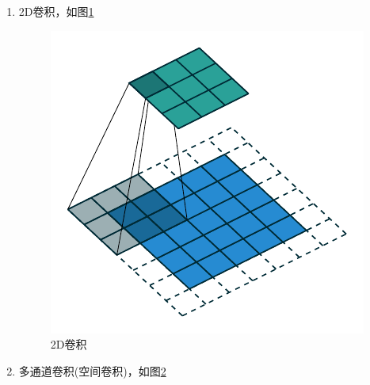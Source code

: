 \begin{enumerate}
	\item 2D卷积，如图\ref{2d_conv}
	\begin{figure}[H]
		\centering
		\label{2d_conv}
		\includegraphics[width=0.3\linewidth]{./img/code/CNN/1.pdf}
		\caption{2D卷积}
	\end{figure}
	\item 多通道卷积(空间卷积)，如图\ref{space_conv}
	\begin{figure}[H]
		\label{space_conv}
		

\end{figure}
\end{enumerate}
